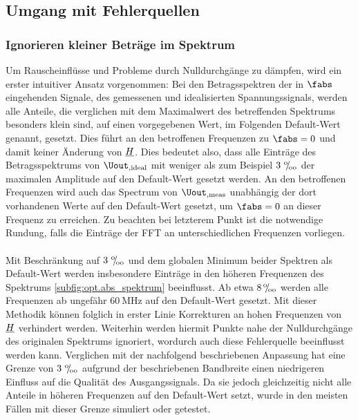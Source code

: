 \documentclass[../Report.tex]{subfiles}
\begin{document}
\subsection{Umgang mit Fehlerquellen}
\label{subsec:opt.H.handle_fehler}

\subsubsection*{Ignorieren kleiner Beträge im Spektrum}
\label{subsubsec:opt.H.prom}

Um Rauscheinflüsse und Probleme durch Nulldurchgänge zu dämpfen, wird ein erster intuitiver Ansatz vorgenommen: Bei den Betragsspektren der in $\fabs$ eingehenden Signale, des gemessenen und idealisierten Spannungssignals, werden alle Anteile, die verglichen mit dem Maximalwert des betreffenden Spektrums besonders klein sind, auf einen vorgegebenen Wert, im Folgenden Default-Wert genannt, gesetzt. Dies führt an den betroffenen Frequenzen zu $\fabs = 0$ und damit keiner Änderung von $\underline{H}$.
Dies bedeutet also, dass alle Einträge des Betragsspektrums von $\Uout_{,\mathrm{ideal}}$ mit weniger als zum Beispiel $3 \, \, {}^\text{o}\mkern-5mu/\mkern-3mu_\text{oo} $ der maximalen Amplitude auf den Default-Wert gesetzt werden. An den betroffenen Frequenzen wird auch das Spectrum von $\Uout_{,\mathrm{meas}}$ unabhängig der dort vorhandenen Werte auf den Default-Wert gesetzt, um $\fabs = 0$ an dieser Frequenz zu erreichen.
Zu beachten bei letzterem Punkt ist die notwendige Rundung, falls die Einträge der FFT an unterschiedlichen Frequenzen vorliegen. 
\\
\\
\noindent
Mit Beschränkung auf $3 \, \, {}^\text{o}\mkern-5mu/\mkern-3mu_\text{oo}$ und dem globalen Minimum beider Spektren als Default-Wert werden insbesondere Einträge in den höheren Frequenzen des Spektrums \ref{subfig:opt.abs_spektrum} beeinflusst. Ab etwa $8 \, {}^\text{o}\mkern-5mu/\mkern-3mu_\text{oo}$ werden alle Frequenzen ab ungefähr $\SI{60}{\MHz}$ auf den Default-Wert gesetzt. Mit dieser Methodik können folglich in erster Linie Korrekturen an hohen Frequenzen von $\underline{H}$ verhindert werden. Weiterhin werden hiermit Punkte nahe der Nulldurchgänge des originalen Spektrums ignoriert, wordurch auch diese Fehlerquelle beeinflusst werden kann.
Verglichen mit der nachfolgend beschriebenen Anpassung hat eine Grenze von $3 \, \, {}^\text{o}\mkern-5mu/\mkern-3mu_\text{oo}$ aufgrund der beschriebenen Bandbreite einen niedrigeren Einfluss auf die Qualität des Ausgangssignals. Da sie jedoch gleichzeitig nicht alle Anteile in höheren Frequenzen auf den Default-Wert setzt, wurde in den meisten Fällen mit dieser Grenze simuliert oder getestet.
\end{document}
